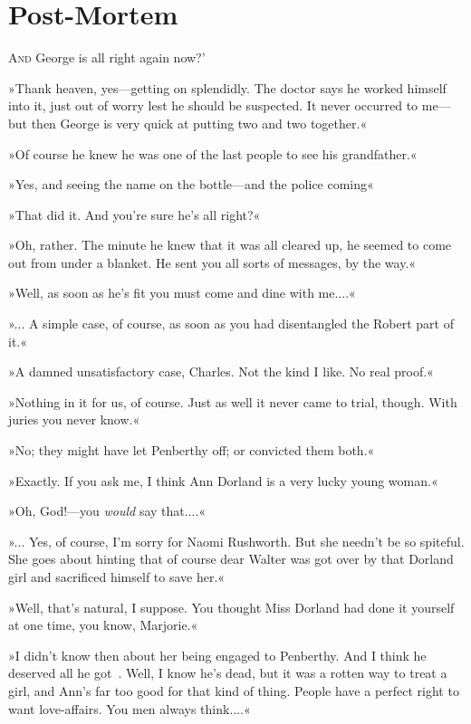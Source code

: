 \chapter{Post-Mortem}

\lettrine[lines=4,ante=‘]{A}{nd} George is all right again now?'

\zz
»Thank heaven, yes—getting on splendidly. The doctor says he worked himself into it, just out of worry lest he should be suspected. It never occurred to me—but then George is very quick at putting two and two together.«

»Of course he knew he was one of the last people to see his grandfather.«

»Yes, and seeing the name on the bottle—and the police coming\longdash«

»That did it. And you're sure he's all right?«

»Oh, rather. The minute he knew that it was all cleared up, he seemed to come out from under a blanket. He sent you all sorts of messages, by the way.«

»Well, as soon as he's fit you must come and dine with me....«

»... A simple case, of course, as soon as you had disentangled the Robert part of it.«

»A damned unsatisfactory case, Charles. Not the kind I like. No real proof.«

»Nothing in it for us, of course. Just as well it never came to trial, though. With juries you never know.«

»No; they might have let Penberthy off; or convicted them both.«

»Exactly. If you ask me, I think Ann Dorland is a very lucky young woman.«

»Oh, God!—you \textit{would} say that....«

»... Yes, of course, I'm sorry for Naomi Rushworth. But she needn't be so spiteful. She goes about hinting that of course dear Walter was got over by that Dorland girl and sacrificed himself to save her.«

»Well, that's natural, I suppose. You thought Miss Dorland had done it yourself at one time, you know, Marjorie.«

»I didn't know then about her being engaged to Penberthy. And I think he deserved all he got\textellipsis~. Well, I know he's dead, but it was a rotten way to treat a girl, and Ann's far too good for that kind of thing. People have a perfect right to want love-affairs. You men always think....«

